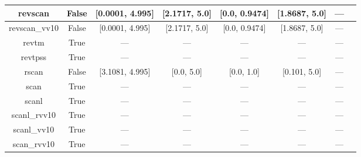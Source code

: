 \begin{tabular}{|c|c|c|c|c|c|c|l|}
      revscan &                 False &  [0.0001, 4.995] &    [2.1717, 5.0] &    [0.0, 0.9474] &  [1.8687, 5.0] &        --- &                                                              \cite{Mezei2018_2469} \\ \hline
revscan\_vv10 &                 False &  [0.0001, 4.995] &    [2.1717, 5.0] &    [0.0, 0.9474] &  [1.8687, 5.0] &        --- &                                                              \cite{Mezei2018_2469} \\ \hline
        revtm &                  True &              --- &              --- &              --- &            --- &        --- &                                                               \cite{Jana2019_6356} \\ \hline
      revtpss &                  True &              --- &              --- &              --- &            --- &        --- &                                     \cite{Perdew2009_026403,Perdew2009_026403_err} \\ \hline
        rscan &                 False &  [3.1081, 4.995] &       [0.0, 5.0] &       [0.0, 1.0] &   [0.101, 5.0] &        --- &                                                           \cite{Bartok2019_161101} \\ \hline
         scan &                  True &              --- &              --- &              --- &            --- &        --- &                                                              \cite{Sun2015_036402} \\ \hline
        scanl &                  True &              --- &              --- &              --- &            --- &        --- &                            \cite{Mejia2017_052512,Mejia2018_115161,Sun2015_036402} \\ \hline
 scanl\_rvv10 &                  True &              --- &              --- &              --- &            --- &        --- &                           \cite{Mejia2017_052512,Mejia2018_115161,Peng2016_041005} \\ \hline
  scanl\_vv10 &                  True &              --- &              --- &              --- &            --- &        --- &                    \cite{Mejia2017_052512,Mejia2018_115161,Brandenburg2016_115144} \\ \hline
  scan\_rvv10 &                  True &              --- &              --- &              --- &            --- &        --- &                                                             \cite{Peng2016_041005} \\ \hline

\end{tabular}

